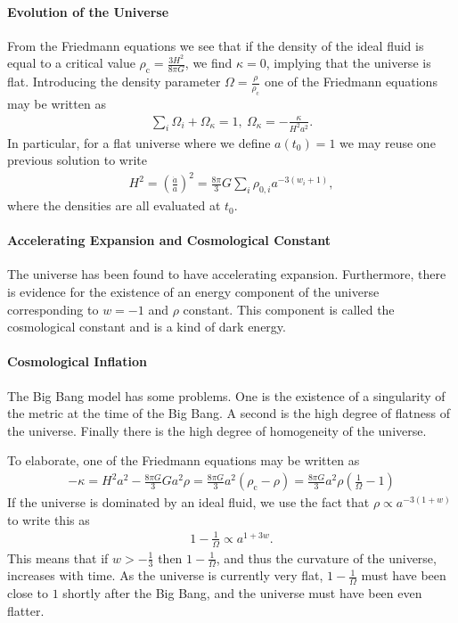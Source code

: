 \paragraph{Evolution of the Universe}
From the Friedmann equations we see that if the density of the ideal fluid is equal to a critical value $\rho_{\text{c}} = \frac{3H^{2}}{8\pi G}$, we find $\kappa = 0$, implying that the universe is flat. Introducing the density parameter $\Omega = \frac{\rho}{\rho_{\text{c}}}$ one of the Friedmann equations may be written as
\begin{align*}
	\sum\limits_{i}\Omega_{i} + \Omega_{\kappa} = 1,\ \Omega_{\kappa} = -\frac{\kappa}{H^{2}a^{2}}.
\end{align*}
In particular, for a flat universe where we define $a(t_{0}) = 1$ we may reuse one previous solution to write
\begin{align*}
	H^{2} = \left(\frac{\dot{a}}{a}\right)^{2} = \frac{8\pi}{3}G\sum\limits_{i}\rho_{0, i}a^{-3(w_{i} + 1)},
\end{align*}
where the densities are all evaluated at $t_{0}$.

\paragraph{Accelerating Expansion and Cosmological Constant}
The universe has been found to have accelerating expansion. Furthermore, there is evidence for the existence of an energy component of the universe corresponding to $w = -1$ and $\rho$ constant. This component is called the cosmological constant and is a kind of dark energy.

\paragraph{Cosmological Inflation}
The Big Bang model has some problems. One is the existence of a singularity of the metric at the time of the Big Bang. A second is the high degree of flatness of the universe. Finally there is the high degree of homogeneity of the universe.

To elaborate, one of the Friedmann equations may be written as
\begin{align*}
	-\kappa = H^{2}a^{2} - \frac{8\pi G}{3}Ga^{2}\rho = \frac{8\pi G}{3}a^{2}\left(\rho_{\text{c}} - \rho\right) = \frac{8\pi G}{3}a^{2}\rho\left(\frac{1}{\Omega} - 1\right)
\end{align*}
If the universe is dominated by an ideal fluid, we use the fact that $\rho\propto a^{-3(1 + w)}$ to write this as
\begin{align*}
	1 - \frac{1}{\Omega} \propto a^{1 + 3w}.
\end{align*}
This means that if $w > -\frac{1}{3}$ then $1 - \frac{1}{\Omega}$, and thus the curvature of the universe, increases with time. As the universe is currently very flat, $1 - \frac{1}{\Omega}$ must have been close to $1$ shortly after the Big Bang, and the universe must have been even flatter.

